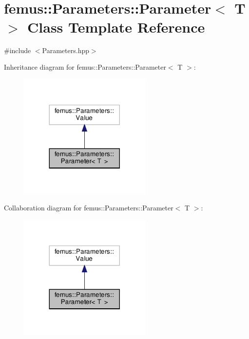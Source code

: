 \hypertarget{classfemus_1_1_parameters_1_1_parameter}{}\section{femus\+:\+:Parameters\+:\+:Parameter$<$ T $>$ Class Template Reference}
\label{classfemus_1_1_parameters_1_1_parameter}


{\ttfamily \#include $<$Parameters.\+hpp$>$}



Inheritance diagram for femus\+:\+:Parameters\+:\+:Parameter$<$ T $>$\+:
\nopagebreak
\begin{figure}[H]
\begin{center}
\leavevmode
\includegraphics[width=188pt]{classfemus_1_1_parameters_1_1_parameter__inherit__graph}
\end{center}
\end{figure}


Collaboration diagram for femus\+:\+:Parameters\+:\+:Parameter$<$ T $>$\+:
\nopagebreak
\begin{figure}[H]
\begin{center}
\leavevmode
\includegraphics[width=188pt]{classfemus_1_1_parameters_1_1_parameter__coll__graph}
\end{center}
\end{figure}
